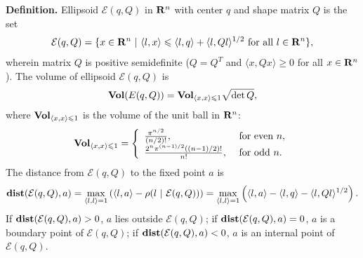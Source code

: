\documentclass[letterpaper,10pt,english]{sphinxmanual}
\begin{document}
\textbf{Definition.} Ellipsoid \({\mathcal E}(q,Q)\) in \({\bf R}^n\) with center
\(q\) and shape matrix \(Q\) is the set
\label{chap_ellcalc:equation-ellipsoid2}\begin{gather}
\begin{split}{\mathcal E}(q,Q) = \{ x \in {\bf R}^n ~|~
\langle l,x\rangle\leqslant\langle l,q\rangle + \langle l,Ql\rangle^{1/2}
\mbox{ for all } l\in{\bf R}^n \},\end{split}\label{chap_ellcalc-ellipsoid2}
\end{gather}
wherein matrix \(Q\) is positive semidefinite (\(Q=Q^T\) and
\(\langle x, Qx\rangle\geqslant0\) for all \(x\in{\bf R}^n\)).
The volume of ellipsoid \({\mathcal E}(q,Q)\) is
\label{chap_ellcalc:equation-ellvolume}\begin{gather}
\begin{split}{\bf Vol}(E(q,Q)) = {\bf Vol}_{\langle x,x\rangle\leqslant1}\sqrt{\det Q},\end{split}\label{chap_ellcalc-ellvolume}
\end{gather}
where \({\bf Vol}_{\langle x,x\rangle\leqslant1}\) is the volume of
the unit ball in \({\bf R}^n\):
\label{chap_ellcalc:equation-ellunitball}\begin{gather}
\begin{split}{\bf Vol}_{\langle x,x\rangle\leqslant1} = \left\{\begin{array}{ll}
\frac{\pi^{n/2}}{(n/2)!}, &
\mbox{ for even } n,\\
\frac{2^n\pi^{(n-1)/2}\left((n-1)/2\right)!}{n!}, &
\mbox{ for odd } n. \end{array}\right.\end{split}\label{chap_ellcalc-ellunitball}
\end{gather}
The distance from \({\mathcal E}(q,Q)\) to the fixed point \(a\)
is
\label{chap_ellcalc:equation-dist_point}\begin{gather}
\begin{split}{\bf dist}({\mathcal E}(q,Q),a) = \max_{\langle l,l\rangle=1}\left(\langle l,a\rangle -
\rho(l ~|~ {\mathcal E}(q,Q)) \right) =
\max_{\langle l,l\rangle=1}\left(\langle l,a\rangle - \langle l,q\rangle -
\langle l,Ql\rangle^{1/2}\right).\end{split}\label{chap_ellcalc-dist_point}
\end{gather}
If \({\bf dist}({\mathcal E}(q,Q),a) > 0\), \(a\) lies outside
\({\mathcal E}(q,Q)\); if
\({\bf dist}({\mathcal E}(q,Q),a) = 0\), \(a\) is a boundary
point of \({\mathcal E}(q,Q)\); if
\({\bf dist}({\mathcal E}(q,Q),a) < 0\), \(a\) is an internal
point of \({\mathcal E}(q,Q)\).
\end{document}
